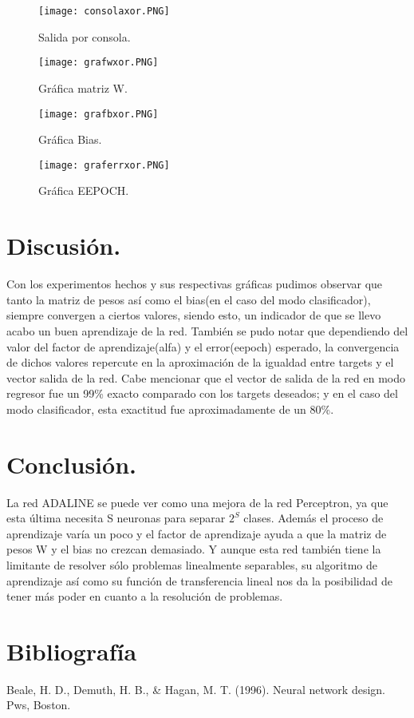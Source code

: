 \documentclass[]{article}
\begin{document}
\begin{figure}[H]
	\centering
	\texttt{[image: consolaxor.PNG]}
	\caption{Salida por consola.}
\end{figure}
\begin{figure}[H]
	\centering
	\texttt{[image: grafwxor.PNG]}
	\caption{Gráfica matriz W.}
\end{figure}
\begin{figure}[H]
	\centering
	\texttt{[image: grafbxor.PNG]}
	\caption{Gráfica Bias.}
\end{figure}
\begin{figure}[H]
	\centering
	\texttt{[image: graferrxor.PNG]}
	\caption{Gráfica EEPOCH.}
\end{figure}
\section{Discusión.}	
Con los experimentos hechos y sus respectivas gráficas pudimos observar que tanto la matriz de pesos así como el bias(en el caso del modo clasificador), siempre convergen a ciertos valores, siendo esto, un indicador de que se llevo acabo un buen aprendizaje de la red. También se pudo notar que dependiendo del valor del factor de aprendizaje(alfa) y el error(eepoch) esperado, la convergencia de dichos valores repercute en la aproximación de la igualdad entre targets y el vector salida de la red. Cabe mencionar que el vector de salida de la red en modo regresor fue un 99\% exacto comparado con los targets deseados; y en el caso del modo clasificador, esta exactitud fue aproximadamente de un 80\%.
\section{Conclusión.} 
La red ADALINE se puede ver como una mejora de la red Perceptron, ya que esta última necesita S neuronas para separar $2^S$ clases. Además el proceso de aprendizaje varía un poco y el factor de aprendizaje ayuda a que la matriz de pesos W y el bias no crezcan demasiado. Y aunque esta red también tiene la limitante de resolver sólo problemas linealmente separables, su algoritmo de aprendizaje así como su función de transferencia lineal nos da la posibilidad de tener más poder en cuanto a la resolución de problemas.

\section{Bibliografía} 

Beale, H. D., Demuth, H. B., \& Hagan, M. T. (1996). Neural network design. Pws, Boston. 
	
		
\end{document}
